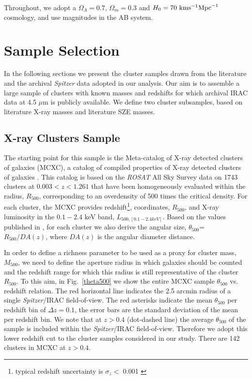 \documentclass[apj,twocolumn]{emulateapj}
\begin{document}
Throughout, we adopt a $\Omega_{\Lambda} = 0.7$, $\Omega_{m} = 0.3$ and $H_{0} = 70\ \rm{km} \rm{s}^{-1} \rm{Mpc}^{-1}$ cosmology, and use magnitudes in the AB system.

\section{Sample Selection}

In the following sections we present  the cluster samples drawn from the literature and the archival {\it Spitzer} data adopted in our analysis. Our aim is to assemble a large sample of clusters with known masses and redshifts for which archival IRAC data at 4.5 $\mu$m is publicly available. We define two cluster subsamples, based on literature X-ray masses and literature SZE masses. 

\subsection{X-ray Clusters Sample}
The starting point for this sample is the Meta-catalog of X-ray detected clusters of galaxies (MCXC), a catalog of compiled properties of X-ray detected clusters of galaxies \citep[][and references therein]{Piffaretti11}. This catalog is based on the {\it ROSAT} All Sky Survey \citep[RASS,][]{Voges99} data on 1743 clusters at $0.003< z<1.261$ that have been  homogeneously evaluated within the radius, $R_{500}$, corresponding to  an overdensity of 500 times the critical density.  For each cluster, the MCXC provides redshift\footnote{typical redshift uncertainty is  $\sigma_{z}<$ 0.001 \citep[see discussion in][]{Liu15}}, coordinates, $R_{500}$, and  X-ray luminosity in the $0.1-2.4$ keV band, $L_{500, [0.1-2.4 keV]}$. Based on  the values published in \citet{Piffaretti11}, for each cluster we also derive the angular size, $\theta_{500}$= $R_{500}/DA(z)$, where $DA(z)$ is the angular diameter distance.

In order to define a richness parameter to be used as a proxy for cluster mass, $M_{500}$, we need to define the aperture radius in which galaxies should be counted and the redshift range for which this radius is still representative of the cluster $R_{500}$.  To this aim, in Fig.~\ref{theta500} we show the entire MCXC sample $\theta_{500}$ vs. redshift relation. The red horizontal line indicates the  2.5 arcmin radius of a single {\it Spitzer}/IRAC field-of-view. The red asterisks indicate the mean $\theta_{500}$ per redshift bin of $\Delta z=0.1$, the error bars are the standard deviation of the mean per redshift bin. We note that at $z>0.4$ (dot-dashed line) the average $\theta_{500}$ of the sample is included within the {\it Spitzer}/IRAC field-of-view. Therefore we adopt this lower redshift cut to the cluster samples considered in our study. There are 142 clusters in MCXC at $z>0.4$.
\end{document}
